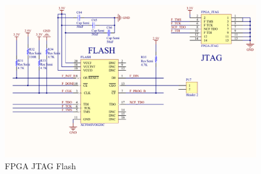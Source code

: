 \begin{figure}[h]
  \centering
  \includegraphics[width=\textwidth]{fig/pcb/schematics/pcbschematic_jtagflash.pdf}
  \caption{FPGA JTAG Flash}
  \label{fig:schematic-pcb-jtagflash}
\end{figure}

